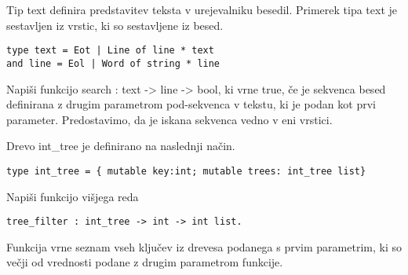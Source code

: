 \begin{ex}
  Tip text definira predstavitev teksta v urejevalniku
  besedil. Primerek tipa text je sestavljen iz vrstic, ki so
  sestavljene iz besed.

\begin{lstlisting}
type text = Eot | Line of line * text
and line = Eol | Word of string * line
\end{lstlisting}

  Napi\v si funkcijo search : text -> line -> bool, ki vrne true, \v
  ce je sekvenca besed definirana z drugim parametrom pod-sekvenca v
  tekstu, ki je podan kot prvi parameter. Predostavimo, da je iskana
  sekvenca vedno v eni vrstici.


\end{ex} 
\begin{ex}
  Drevo int\_tree je definirano na naslednji na\v cin.

\begin{lstlisting}
type int_tree = { mutable key:int; mutable trees: int_tree list}
\end{lstlisting}

  Napi\v si funkcijo vi\v sjega reda

\begin{lstlisting}
tree_filter : int_tree -> int -> int list.
\end{lstlisting}

  Funkcija vrne seznam vseh klju\v cev iz drevesa podanega s prvim
  parametrim, ki so ve\v cji od vrednosti podane z drugim parametrom
  funkcije.


\end{ex} 

